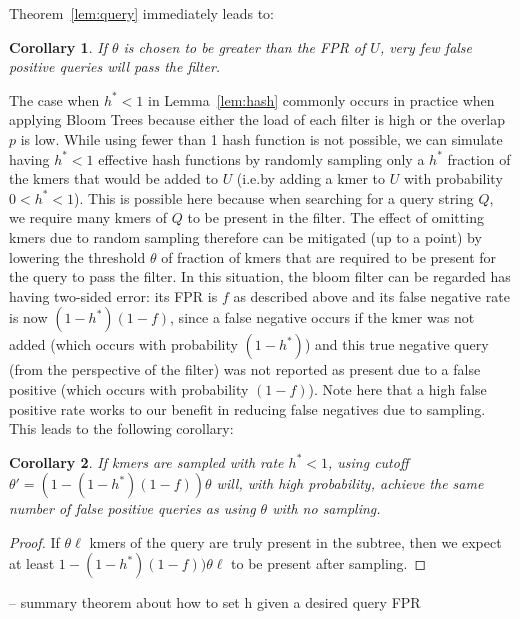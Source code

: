 \documentclass[11pt]{article}
\newtheorem{cor}{Corollary}
\begin{document}
Theorem~\ref{lem:query} immediately leads to:
\begin{cor}
If $\theta$ is chosen to be greater than the FPR of $U$, very few false positive queries will pass the filter.
\end{cor}


The case when $h^* < 1$  in Lemma~\ref{lem:hash} commonly occurs in practice when applying Bloom Trees because either the load of each filter is high or the overlap $p$ is low. While using fewer than 1 hash function is not possible, we can simulate having $h^* < 1$ effective hash functions  by randomly sampling only a $h^*$ fraction of the kmers that would be added to $U$ (i.e.\@ by adding a kmer to $U$ with probability $0 < h^* < 1$). This is possible here because when searching for a query string $Q$, we require many kmers of $Q$ to be present in the filter. The effect of omitting kmers due to random sampling therefore can be mitigated (up to a point) by lowering the  threshold $\theta$ of fraction of kmers that are required to be present  for the query to pass the filter.  In this situation, the bloom filter can be regarded has having two-sided error: its FPR is $f$ as described above and its false negative rate is now $(1-h^*)(1-f)$, since a false negative occurs if the kmer was not added (which occurs with probability $(1-h^*)$) and this true negative query (from the perspective of the filter) was not reported as present due to a false positive (which occurs with probability $(1-f)$). Note here that a high false positive rate works to our benefit in reducing false negatives due to sampling. This leads to the following corollary:

\begin{cor}
If kmers are sampled with rate $h^* < 1$, using cutoff $\theta' = (1-(1-h^*)(1-f))\theta$ will, with high probability, achieve the same number of false positive queries as using $\theta$ with no sampling.
\end{cor}
\begin{proof}
If $\theta\ell$ kmers of the query are truly present in the subtree, then we expect at least $1-(1-h^*)(1-f))\theta\ell$ to be present after sampling.
\end{proof}

-- summary theorem about how to set h given a desired query FPR

\end{document}
